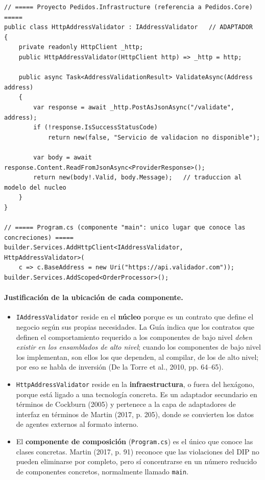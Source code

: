 \documentclass[11pt,a4paper]{article}
\begin{document}
\begin{lstlisting}[caption={Infraestructura: adaptador concreto y composición en el punto de arranque.},label={lst:infra}]
// ===== Proyecto Pedidos.Infrastructure (referencia a Pedidos.Core) =====
public class HttpAddressValidator : IAddressValidator   // ADAPTADOR
{
    private readonly HttpClient _http;
    public HttpAddressValidator(HttpClient http) => _http = http;

    public async Task<AddressValidationResult> ValidateAsync(Address address)
    {
        var response = await _http.PostAsJsonAsync("/validate", address);
        if (!response.IsSuccessStatusCode)
            return new(false, "Servicio de validacion no disponible");

        var body = await response.Content.ReadFromJsonAsync<ProviderResponse>();
        return new(body!.Valid, body.Message);   // traduccion al modelo del nucleo
    }
}

// ===== Program.cs (componente "main": unico lugar que conoce las concreciones) =====
builder.Services.AddHttpClient<IAddressValidator, HttpAddressValidator>(
    c => c.BaseAddress = new Uri("https://api.validador.com"));
builder.Services.AddScoped<OrderProcessor>();
\end{lstlisting}

\paragraph{Justificación de la ubicación de cada componente.}
\begin{itemize}[leftmargin=1.5em]
  \item \texttt{IAddressValidator} reside en el \textbf{núcleo} porque es un contrato que define el negocio según sus propias necesidades. La Guía indica que los contratos que definen el comportamiento requerido a los componentes de bajo nivel \emph{deben existir en los ensamblados de alto nivel}; cuando los componentes de bajo nivel los implementan, son ellos los que dependen, al compilar, de los de alto nivel; por eso se habla de inversión (De la Torre et al., 2010, pp. 64--65).
  \item \texttt{HttpAddressValidator} reside en la \textbf{infraestructura}, o fuera del hexágono, porque está ligado a una tecnología concreta. Es un adaptador secundario en términos de Cockburn (2005) y pertenece a la capa de adaptadores de interfaz en términos de Martin (2017, p. 205), donde se convierten los datos de agentes externos al formato interno.
  \item El \textbf{componente de composición} (\texttt{Program.cs}) es el único que conoce las clases concretas. Martin (2017, p. 91) reconoce que las violaciones del DIP no pueden eliminarse por completo, pero sí concentrarse en un número reducido de componentes concretos, normalmente llamado \texttt{main}.
\end{itemize}
\end{document}
